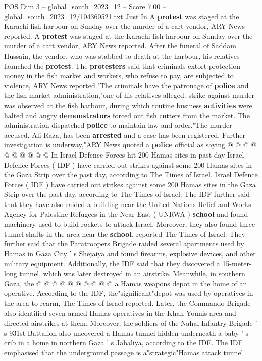 \begin{textsample}{POS Dim 3 – global\_south\_2023\_12 – Score 7.00 – global\_south\_2023\_12/104360521.txt}  \label{ex:f3_pos_442}
Just In A \textbf{protest} was staged at the Karachi fish harbour on Sunday over the murder of a cart vendor, ARY News reported.
A \textbf{protest} was staged at the Karachi fish harbour on Sunday over the murder of a cart vendor, ARY News reported.
After the funeral of Saddam Hussain, the vendor, who was stabbed to death at the harbour, his relatives launched the \textbf{protest}.
The \textbf{protesters} said that criminals extort protection money in the fish market and workers, who refuse to pay, are subjected to violence, ARY News reported."The criminals have the patronage of \textbf{police} and the fish market administration,"one of his relatives alleged. strike against murder was observed at the fish harbour, during which routine business \textbf{activities} were halted and angry \textbf{demonstrators} forced out fish cutters from the market.
The administration dispatched \textbf{police} to maintain law and order."The murder accused, Ali Raza, has been \textbf{arrested} and a case has been registered.
Further investigation is underway,"ARY News quoted a \textbf{police} official as saying @ @ @ @ @ @ @ @ @ @ In Israel Defence Forces hit 200 Hamas sites in past day Israel Defence Forces ( IDF ) have carried out strikes against some 200 Hamas sites in the Gaza Strip over the past day, according to The Times of Israel.
Israel Defence Forces ( IDF ) have carried out strikes against some 200 Hamas sites in the Gaza Strip over the past day, according to The Times of Israel.
The IDF further said that they have also raided a building near the United Nations Relief and Works Agency for Palestine Refugees in the Near East ( UNRWA ) \textbf{school} and found machinery used to build rockets to attack Israel.
Moreover, they also found three tunnel shafts in the area near the \textbf{school}, reported The Times of Israel.
They further said that the Paratroopers Brigade raided several apartments used by Hamas in Gaza City ' s Shejaiya and found firearms, explosive devices, and other military equipment.
Additionally, the IDF said that they discovered a 15-meter-long tunnel, which was later destroyed in an airstrike.
Meanwhile, in southern Gaza, the @ @ @ @ @ @ @ @ @ @ a Hamas weapons depot in the home of an operative.
According to the IDF, the"significant"depot was used by operatives in the area to rearm, The Times of Israel reported.
Later, the Commando Brigade also identified seven armed Hamas operatives in the Khan Younis area and directed airstrikes at them.
Moreover, the soldiers of the Nahal Infantry Brigade ' s 931st Battalion also uncovered a Hamas tunnel hidden underneath a baby ' s crib in a home in northern Gaza ' s Jabaliya, according to the IDF.
The IDF emphasised that the underground passage is a"strategic"Hamas attack tunnel.

\end{textsample}
